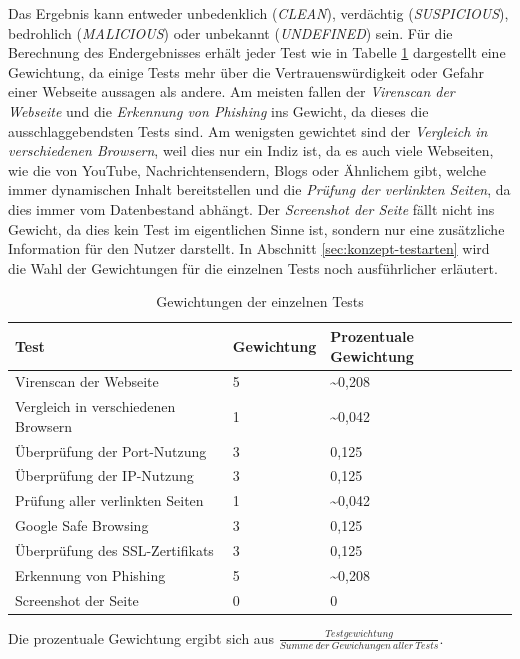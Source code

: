 Das Ergebnis kann entweder unbedenklich (\textit{CLEAN}), verdächtig (\textit{SUSPICIOUS}), bedrohlich (\textit{MALICIOUS}) oder unbekannt (\textit{UNDEFINED}) sein. Für die Berechnung des Endergebnisses erhält jeder Test wie in Tabelle \ref{tbl:test-weights} dargestellt eine Gewichtung, da einige Tests mehr über die Vertrauenswürdigkeit oder Gefahr einer Webseite aussagen als andere. Am meisten fallen der \textit{Virenscan der Webseite} und die \textit{Erkennung von Phishing} ins Gewicht, da dieses die ausschlaggebendsten Tests sind. Am wenigsten gewichtet sind der \textit{Vergleich in verschiedenen Browsern}, weil dies nur ein Indiz ist, da es auch viele Webseiten, wie die von YouTube, Nachrichtensendern, Blogs oder Ähnlichem gibt, welche immer dynamischen Inhalt bereitstellen und die \textit{Prüfung der verlinkten Seiten}, da dies immer vom Datenbestand abhängt. Der \textit{Screenshot der Seite} fällt nicht ins Gewicht, da dies kein Test im eigentlichen Sinne ist, sondern nur eine zusätzliche Information für den Nutzer darstellt. In Abschnitt \ref{sec:konzept-testarten} wird die Wahl der Gewichtungen für die einzelnen Tests noch ausführlicher erläutert.

\begin{table}[H]
\centering
\begin{tabular}{|l|l|l|l|}
\hline
\textbf{Test} & \textbf{Gewichtung} & \textbf{Prozentuale Gewichtung} \\\hline
Virenscan der Webseite & 5 & \textasciitilde0,208\\\hline
Vergleich in verschiedenen Browsern & 1 & \textasciitilde0,042\\\hline
Überprüfung der Port-Nutzung & 3 & 0,125\\\hline
Überprüfung der IP-Nutzung & 3 & 0,125\\\hline
Prüfung aller verlinkten Seiten & 1 & \textasciitilde0,042\\\hline
Google Safe Browsing & 3 & 0,125\\\hline
Überprüfung des SSL-Zertifikats & 3 & 0,125\\\hline
Erkennung von Phishing & 5 & \textasciitilde0,208\\\hline
Screenshot der Seite & 0 & 0\\\hline
\end{tabular}
\caption{Gewichtungen der einzelnen Tests}
\label{tbl:test-weights}
\end{table}

Die prozentuale Gewichtung ergibt sich aus $\frac{Testgewichtung}{Summe~der~Gewichungen~aller~Tests}$.

